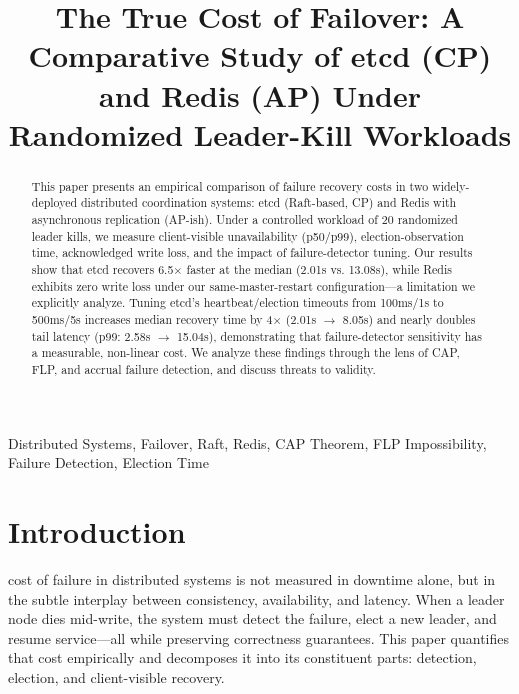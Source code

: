 \documentclass[conference]{IEEEtran}
\begin{document}
\title{The True Cost of Failover: A Comparative Study of etcd (CP) and Redis (AP) Under Randomized Leader-Kill Workloads}

\author{
\and
{}
}

\maketitle

\begin{abstract}
This paper presents an empirical comparison of failure recovery costs in two widely-deployed distributed coordination systems: etcd (Raft-based, CP) and Redis with asynchronous replication (AP-ish). Under a controlled workload of 20 randomized leader kills, we measure client-visible unavailability (p50/p99), election-observation time, acknowledged write loss, and the impact of failure-detector tuning. Our results show that etcd recovers 6.5$\times$ faster at the median (2.01s vs. 13.08s), while Redis exhibits zero write loss under our same-master-restart configuration---a limitation we explicitly analyze. Tuning etcd's heartbeat/election timeouts from 100ms/1s to 500ms/5s increases median recovery time by 4$\times$ (2.01s $\rightarrow$ 8.05s) and nearly doubles tail latency (p99: 2.58s $\rightarrow$ 15.04s), demonstrating that failure-detector sensitivity has a measurable, non-linear cost. We analyze these findings through the lens of CAP, FLP, and accrual failure detection, and discuss threats to validity.
\end{abstract}

\begin{IEEEkeywords}
Distributed Systems, Failover, Raft, Redis, CAP Theorem, FLP Impossibility, Failure Detection, Election Time
\end{IEEEkeywords}

\section{Introduction}
 cost of failure in distributed systems is not measured in downtime alone, but in the subtle interplay between consistency, availability, and latency. When a leader node dies mid-write, the system must detect the failure, elect a new leader, and resume service---all while preserving correctness guarantees. This paper quantifies that cost empirically and decomposes it into its constituent parts: detection, election, and client-visible recovery.
\end{document}
